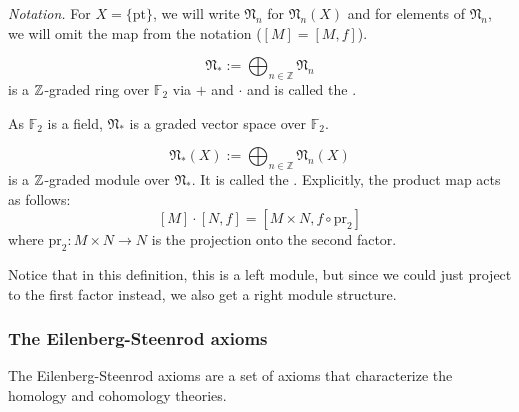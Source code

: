\documentclass[a4paper,11pt]{article}
\begin{document}

\noindent\textit{Notation.} For \(X=\{\mathrm{pt}\}\), we will write \(\mathfrak{N}_n\) for \(\mathfrak{N}_n(X)\) and for elements of \(\mathfrak{N}_n\), we will omit the map from the notation (\([M]=[M,f]\)).

\begin{definition}\label{bordism ring}
    \[\mathfrak{N}_\ast:=\bigoplus_{n\in\mathbb{Z}}\mathfrak{N}_n\]
    is a \(\mathbb{Z}\)-graded ring over \(\mathbb{F}_2\) via \(+\) and \(\cdot\) and is called the .
\end{definition}

\begin{remark}
    As \(\mathbb{F}_2\) is a field, \(\mathfrak{N}_\ast\) is a graded vector space over \(\mathbb{F}_2\).
\end{remark}


\begin{definition}\label{bordism module}
    \[\mathfrak{N}_\ast(X):=\bigoplus_{n\in\mathbb{Z}}\mathfrak{N}_n(X)\]
    is a \(\mathbb{Z}\)-graded module over \(\mathfrak{N}_\ast\). It is called the . Explicitly, the product map acts as follows:
    \[[M]\cdot[N,f]=[M\times N, f\circ \mathrm{pr}_2]\]
    where \(\mathrm{pr}_2:M\times N\to N\) is the projection onto the second factor.
\end{definition}

\begin{remark}
    Notice that in this definition, this is a left module, but since we could just project to the first factor instead, we also get a right module structure.
\end{remark}

\subsubsection{The Eilenberg-Steenrod axioms}\label{es axioms}
The Eilenberg-Steenrod axioms are a set of axioms that characterize the homology and cohomology theories.
\end{document}
